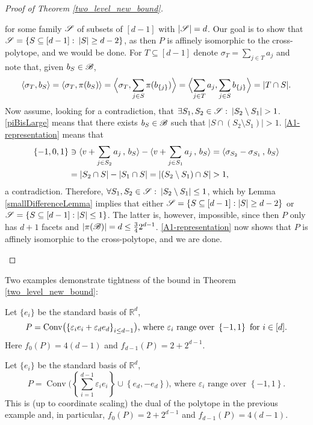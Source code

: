 \begin{proof}[Proof of Theorem \ref{two_level_new_bound}]
\begin{enumerate}
        for some family ${\mathscr{S}}$ of subsets of $[d-1]$ with $|{\mathscr{S}}| = d$. Our goal is to show that ${{\mathscr{S}}= \{S\subseteq[d-1]:\:|S|\geq d-2\}}$, as then $P$ is affinely isomorphic to the cross-polytope, and we would be done. For $T \subseteq [d-1]$ denote $\sigma_T=\sum_{j\in T} a_j$ and note that, given $b_S\in {\mathscr{B}}$,
        \[
            \langle \sigma_T, b_S \rangle = \langle \sigma_T, \pi(b_S) \rangle = \Bigl< \sigma_T, \sum_{j\in S}\pi(b_{\{j\}}) \Bigr> = \Bigl< \sum_{j\in T} a_j, \sum_{j\in S}b_{\{j\}} \Bigr> = |T \cap S|.
        \]
        Now assume, looking for a contradiction, that $\exists S_1, S_2 \in {\mathscr{S}}:\:|S_2\setminus S_1| > 1$. \eqref{piBisLarge} means that there exists $b_S\in {\mathscr{B}}$ such that $|S \cap (S_2 \setminus S_1)| > 1$. \eqref{A1-representation}
        means that 
        \begin{align*}
            \{-1,0,1\} & \ni \langle v+\sum_{j \in S_2}  a_j\,,\,b_{S}\rangle - \langle v+\sum_{j \in S_1} a_j\,,\, b_{S} \rangle = \langle \sigma_{S_2} - \sigma_{S_1}\,,\, b_{S} \rangle \\ &
            = |S_2 \cap S| - |S_1 \cap S| = |(S_2 \setminus S_1) \cap S| > 1,
        \end{align*}
        a contradiction. Therefore, $\forall S_1, S_2 \in {\mathscr{S}}:\:|S_2\setminus S_1| \leq 1$, which by Lemma \ref{smallDifferenceLemma} implies that either ${\mathscr{S}} = \{S\subseteq[d-1]: |S| \geq d-2\}$ or ${\mathscr{S}} = \{S\subseteq[d-1]: |S| \leq 1\}$. The latter is, however, impossible, since then $P$ only has $d+1$ facets and $|\pi({\mathscr{B}})| = d \leq \frac{3}{4} 2^{d-1}$. \eqref{A1-representation} now shows that $P$ is affinely isomorphic to the cross-polytope, and we are done.
    \end{enumerate}
\end{proof}

 \noindent Two examples demonstrate tightness of the bound in Theorem \ref{two_level_new_bound}:

\begin{example}\label{OctahedronCrossSegment}
    Let $\{e_i\}$ be the standard basis of $\mathbb{R}^d$,
    \begin{equation*}
        P=\operatorname{Conv}\bigl(\left\{{\varepsilon}_i e_i + {\varepsilon}_d e_d\right\}_{i\leq d-1}\bigr)\text{, where }{\varepsilon}_i\text{ range over }\left\{-1, 1\right\}\text{ for $i\in[d]$}.
    \end{equation*}
    Here $f_0(P) = 4(d-1)$ and $f_{d-1}(P) = 2 + 2^{d-1}$. 
\end{example}

\begin{example}\label{CubeSuspension}
    Let $\{e_i\}$ be the standard basis of $\mathbb{R}^d$,
    \begin{equation*}
        P=\operatorname{Conv}\Biggl(\left\{\sum_{i=1}^{d-1}\varepsilon_i e_i\right\}\cup\left\{e_d, -e_d\right\}\Biggr)\text{, where }\varepsilon_i\text{ range over }\left\{-1, 1\right\}.
    \end{equation*}
    This is (up to coordinate scaling) the dual of the polytope in the previous example and, in particular, $f_0(P) = 2 + 2^{d-1}$ and $f_{d-1}(P) = 4(d-1)$.
\end{example}